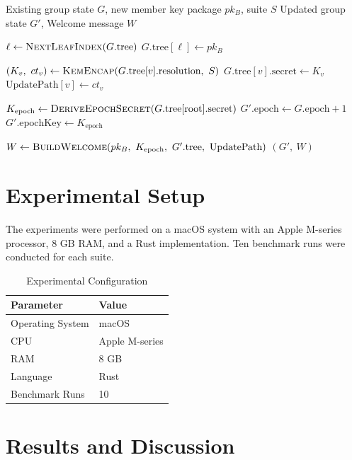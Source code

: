 \documentclass{ieeeaccess}
\begin{document}
\begin{algorithm}[ht]
\caption{MLS Ratchet Tree Update on Member Addition}
\label{alg:tree}
\begin{algorithmic}[1]
\Require Existing group state $G$, new member key package $pk_B$, suite $S$
\Ensure  Updated group state $G'$, Welcome message $W$

\State $\ell \gets \textsc{NextLeafIndex}(G.\text{tree})$
\State $G.\text{tree}[\ell] \gets pk_B$

  \State $(K_v,\ ct_v) \gets \textsc{KemEncap}(G.\text{tree}[v].\text{resolution},\ S)$
  \State $G.\text{tree}[v].\text{secret} \gets K_v$
  \State $\text{UpdatePath}[v] \gets ct_v$
\EndFor

\State $K_{\text{epoch}} \gets \textsc{DeriveEpochSecret}(G.\text{tree}[\text{root}].\text{secret})$
\State $G'.\text{epoch} \gets G.\text{epoch} + 1$
\State $G'.\text{epochKey} \gets K_{\text{epoch}}$

\State $W \gets \textsc{BuildWelcome}(pk_B,\ K_{\text{epoch}},\ G'.\text{tree},\ \text{UpdatePath})$
\State \Return $(G',\ W)$
\end{algorithmic}
\end{algorithm}

\section{Experimental Setup}
The experiments were performed on a macOS system with an Apple M-series processor, 8 GB RAM, and a Rust implementation. Ten benchmark runs were conducted for each suite.

\begin{table}[ht]
\centering
\caption{Experimental Configuration}
\begin{tabular}{ll}
\toprule
Parameter & Value \\
\midrule
Operating System & macOS \\
CPU & Apple M-series \\
RAM & 8 GB \\
Language & Rust \\
Benchmark Runs & 10 \\
\bottomrule
\end{tabular}
\label{tab:setup}
\end{table}

\section{Results and Discussion}
\end{document}
